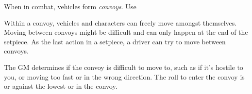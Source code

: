 
When in combat, vehicles form \emph{convoys}. Use

Within a convoy, vehicles and characters can freely move amongst themselves. Moving between convoys might be difficult and can only happen at the end of the setpiece. As the last action in a setpiece, a driver can try to move between convoys.

The GM determines if the convoy is difficult to move to, such as if it's hostile to you, or moving too fast or in the wrong direction. The roll to enter the convoy is  or  against the lowest  or  in the convoy.
